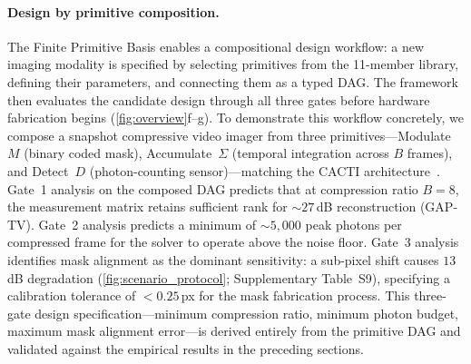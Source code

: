 \documentclass[11pt]{article}
\begin{document}
\paragraph{Design by primitive composition.}
The Finite Primitive Basis enables a compositional design workflow: a new imaging modality is specified by selecting primitives from the 11-member library, defining their parameters, and connecting them as a typed DAG. The framework then evaluates the candidate design through all three gates before hardware fabrication begins (\cref{fig:overview}f--g). To demonstrate this workflow concretely, we compose a snapshot compressive video imager from three primitives---Modulate~$M$ (binary coded mask), Accumulate~$\Sigma$ (temporal integration across $B$ frames), and Detect~$D$ (photon-counting sensor)---matching the CACTI architecture~\cite{yuan2021sci}. Gate~1 analysis on the composed DAG predicts that at compression ratio $B = 8$, the measurement matrix retains sufficient rank for ${\sim}27$\,dB reconstruction (GAP-TV). Gate~2 analysis predicts a minimum of ${\sim}5{,}000$ peak photons per compressed frame for the solver to operate above the noise floor. Gate~3 analysis identifies mask alignment as the dominant sensitivity: a sub-pixel shift causes $13$\,dB degradation (\cref{fig:scenario_protocol}; Supplementary Table~S9), specifying a calibration tolerance of $< 0.25$\,px for the mask fabrication process. This three-gate design specification---minimum compression ratio, minimum photon budget, maximum mask alignment error---is derived entirely from the primitive DAG and validated against the empirical results in the preceding sections.
\end{document}
